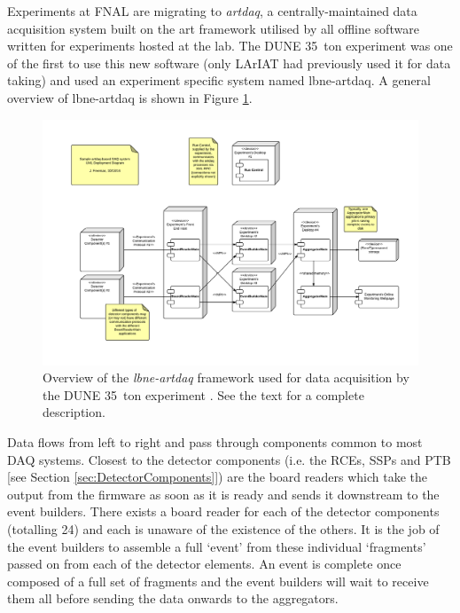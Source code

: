 Experiments at FNAL are migrating to \textit{artdaq}, a centrally-maintained data acquisition system built on the art framework utilised by all offline software written for experiments hosted at the lab.  The DUNE 35~ton experiment was one of the first to use this new software (only LArIAT had previously used it for data taking) and used an experiment specific system named lbne-artdaq.
A general overview of lbne-artdaq is shown in Figure \ref{fig:lbne-artdaq}.

\begin{figure}[ht]
\centering
  \includegraphics[width=16cm]{artdaqFramework.pdf}
  \caption[The \textit{lbne-artdaq} framework]{Overview of the \textit{lbne-artdaq} framework used for data acquisition by the DUNE 35~ton experiment \cite{Freeman2014}.  See the text for a complete description.}
  \label{fig:lbne-artdaq}
\end{figure}

Data flows from left to right and pass through components common to most DAQ systems.  Closest to the detector components (i.e. the RCEs, SSPs and PTB [see Section \ref{sec:DetectorComponents}]) are the board readers which take the output from the firmware as soon as it is ready and sends it downstream to the event builders.  There exists a board reader for each of the detector components (totalling 24) and each is unaware of the existence of the others.  It is the job of the event builders to assemble a full `event' from these individual `fragments' passed on from each of the detector elements.  An event is complete once composed of a full set of fragments and the event builders will wait to receive them all before sending the data onwards to the aggregators.

